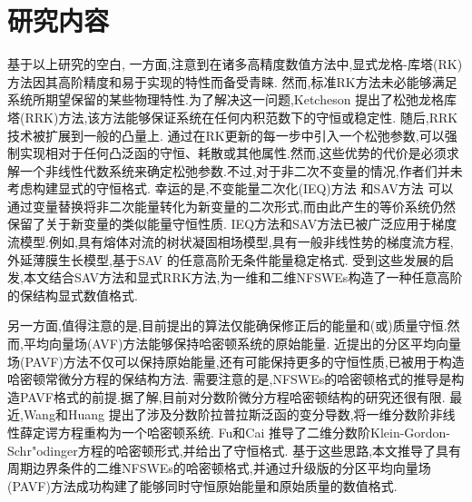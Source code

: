 \section{研究内容}
基于以上研究的空白, 
一方面,注意到在诸多高精度数值方法中,显式龙格-库塔(RK)方法因其高阶精度和易于实现的特性而备受青睐.
然而,标准RK方法未必能够满足系统所期望保留的某些物理特性.为了解决这一问题,Ketcheson \cite{ketchesonRelaxationRungeKutta2019} 提出了松弛龙格库塔(RRK)方法,该方法能够保证系统在任何内积范数下的守恒或稳定性.
随后,RRK技术被扩展到一般的凸量上\cite{ranochaRelaxationRungeKutta2020}.
通过在RK更新的每一步中引入一个松弛参数,可以强制实现相对于任何凸泛函的守恒、耗散或其他属性.然而,这些优势的代价是必须求解一个非线性代数系统来确定松弛参数.不过,对于非二次不变量的情况,作者们并未考虑构建显式的守恒格式.
幸运的是,不变能量二次化(IEQ)方法 \cite{yangLinearUnconditionallyEnergy2017, yangEfficientLinearSchemes2017} 和SAV方法 \cite{chengConvergenceEnergyconservingScheme2022} 可以通过变量替换将非二次能量转化为新变量的二次形式,而由此产生的等价系统仍然保留了关于新变量的类似能量守恒性质.
IEQ方法和SAV方法已被广泛应用于梯度流模型\cite{zhaoNumericalApproximationsPhase2017,shenScalarAuxiliaryVariable2018,liuExponentialScalarAuxiliary2020,chengMultipleScalarAuxiliary2018}.例如,具有熔体对流\cite{chenEfficientNumericalScheme2019}的树状凝固相场模型,具有一般非线性势的梯度流方程\cite{yangConvergenceAnalysisInvariant2020},外延薄膜生长模型\cite{chengHighlyEfficientAccurate2019},基于SAV \cite{gongArbitrarilyHighorderUnconditionally2020}的任意高阶无条件能量稳定格式.
受到这些发展的启发,本文结合SAV方法和显式RRK方法,为一维和二维NFSWEs构造了一种任意高阶的保结构显式数值格式.

另一方面,值得注意的是,目前提出的算法仅能确保修正后的能量和(或)质量守恒.然而,平均向量场(AVF)方法能够保持哈密顿系统的原始能量\cite{buddGeometricIntegrationUsing1999,quispelNewClassEnergypreserving2008}. 
近提出的分区平均向量场(PAVF)方法不仅可以保持原始能量,还有可能保持更多的守恒性质,已被用于构造哈密顿常微分方程的保结构方法\cite{caiPartitionedAveragedVector2018}.
需要注意的是,NFSWEs的哈密顿格式的推导是构造PAVF格式的前提.据了解,目前对分数阶微分方程哈密顿结构的研究还很有限.
最近,Wang和Huang \cite{wangStructurepreservingNumericalMethods2018} 提出了涉及分数阶拉普拉斯泛函的变分导数,将一维分数阶非线性薛定谔方程重构为一个哈密顿系统.
Fu和Cai \cite{fuStructurepreservingAlgorithmsTwodimensional2020} 推导了二维分数阶Klein-Gordon-Schr{"o}dinger方程的哈密顿形式,并给出了守恒格式.
基于这些思路,本文推导了具有周期边界条件的二维NFSWEs的哈密顿格式,并通过升级版的分区平均向量场(PAVF)方法成功构建了能够同时守恒原始能量和原始质量的数值格式.

